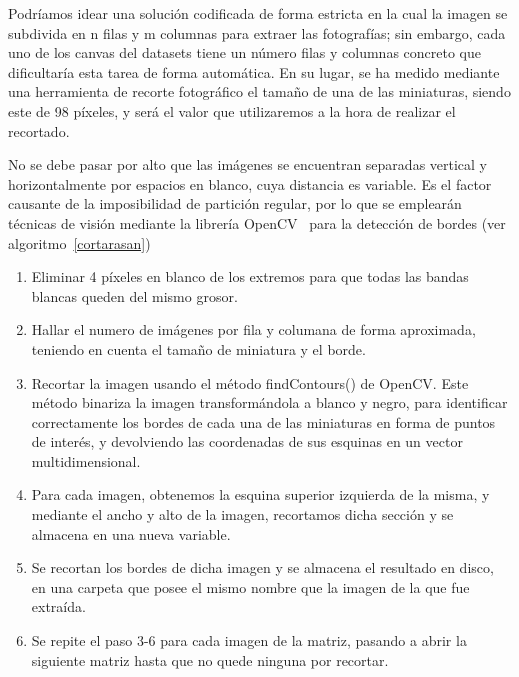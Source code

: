 Podríamos idear una solución codificada de forma estricta en la cual la imagen se subdivida en n filas y m columnas para extraer las fotografías; sin embargo, cada uno de los canvas del datasets tiene un número filas y columnas concreto que dificultaría esta tarea de forma automática. En su lugar, se ha medido mediante una herramienta de recorte fotográfico el tamaño de una de las miniaturas, siendo este de 98 píxeles, y será el valor que utilizaremos a la hora de realizar el recortado.

No se debe pasar por alto que las imágenes se encuentran separadas vertical y horizontalmente por espacios en blanco, cuya distancia es variable. Es el factor causante de la imposibilidad de partición regular, por lo que se emplearán técnicas de visión mediante la librería OpenCV~\cite{itseez2015opencv} para la detección de bordes (ver algoritmo~\ref{cortarasan})

\begin{enumerate}
	\item Eliminar 4 píxeles en blanco de los extremos para que todas las bandas blancas queden del mismo grosor.
	\item Hallar el numero de imágenes por fila y columana de forma aproximada, teniendo en cuenta el tamaño de miniatura y el borde.
	\item Recortar la imagen usando el método findContours() de OpenCV. Este método binariza la imagen transformándola a blanco y negro, para identificar correctamente los bordes de cada una de las miniaturas en forma de puntos de interés, y devolviendo las coordenadas de sus esquinas en un vector multidimensional. 
	\item Para cada imagen, obtenemos la esquina superior izquierda de la misma, y mediante el ancho y alto de la imagen, recortamos dicha sección y se almacena en una nueva variable.
	\item Se recortan los bordes de dicha imagen y se almacena el resultado en disco, en una carpeta que posee el mismo nombre que la imagen de la que fue extraída.
	\item Se repite el paso 3-6 para cada imagen de la matriz, pasando a abrir la siguiente matriz hasta que no quede ninguna por recortar.
\end{enumerate}


